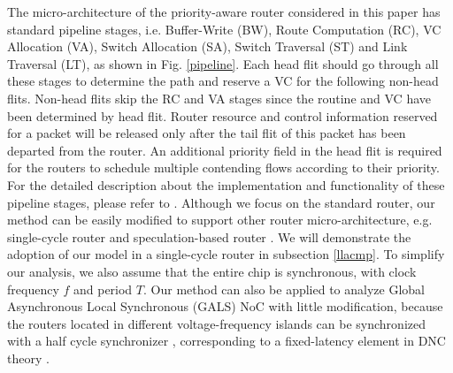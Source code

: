 \documentclass[10pt,journal]{IEEEtran}
\begin{document}
The micro-architecture of the priority-aware router considered in this paper has standard pipeline stages, i.e. Buffer-Write (BW), Route Computation (RC), VC Allocation (VA), Switch Allocation (SA), Switch Traversal (ST) and Link Traversal (LT), as shown in Fig. \ref{pipeline}. Each head flit should go through all these stages to determine the path and reserve a VC for the following non-head flits. Non-head flits skip the RC and VA stages since the routine and VC have been determined by head flit. Router resource and control information reserved for a packet will be released only after the tail flit of this packet has been departed from the router. An additional priority field in the head flit is required for the routers to schedule multiple contending flows according to their priority. For the detailed description about the implementation and functionality of these pipeline stages, please refer to \cite{jerger2009chip}. Although we focus on the standard router, our method can be easily modified to support other router micro-architecture, e.g. single-cycle router \cite{627905}\cite{Shi:2008:RCA:1397757.1397996}\cite{707545}\cite{73} and speculation-based router \cite{jerger2009chip}. We will demonstrate the adoption of our model in a single-cycle router in subsection \ref{llacmp}.  To simplify our analysis, we also assume that the entire chip is synchronous, with clock frequency $f$ and period $T$. Our method can also be applied to analyze Global Asynchronous Local Synchronous (GALS) NoC with little modification, because the routers located in different voltage-frequency islands can be synchronized with a half cycle synchronizer \cite{5476986}, corresponding to a fixed-latency element in DNC theory \cite{Boudec2001Network}.
\end{document}
